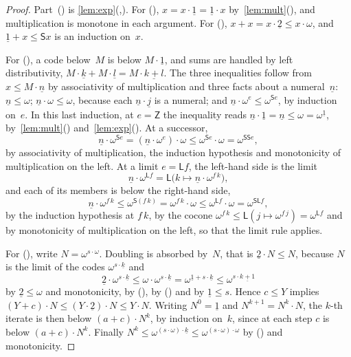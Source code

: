 \documentclass[11pt]{amsart}
\newcommand{\bZ}{\mathsf{Z}}
\newcommand{\bS}{\mathsf{S}}
\newcommand{\bL}{\mathsf{L}}
\newcommand{\bplus}{\mathbin{+}}
\newcommand{\btimes}{\mathbin{\cdot}}
\newcommand{\num}[1]{\underline{#1}}          %
\theoremstyle{plain}
\theoremstyle{definition}
\begin{document}
\begin{proof}
Part~() is
\cref{lem:exp}(,). For
(), $x = x \btimes \num 1 = \num 1 \btimes
x$ by~\cref{lem:mult}(), and multiplication
is monotone in each argument. For
(), $x \bplus x = x \btimes \num 2 \le
x \btimes \omega$, and $\num 1 \bplus x \le \bS x$ is an induction
on~$x$.

For (), a code below~$M$ is below
$M \btimes \num 1$, and sums are handled by left distributivity,
$M \btimes \num k \bplus M \btimes \num l = M \btimes \num{k+l}$. The
three inequalities follow from $x \le M \btimes \num n$ by
associativity of multiplication and three facts about a
numeral~$\num n$: $\num n \le \omega$; $\num n \btimes \omega \le
\omega$, because each $\num n \btimes \num j$ is a numeral; and
$\num n \btimes \omega^{e} \le \omega^{\bS e}$, by induction on~$e$.
In this last induction, at $e = \bZ$ the inequality reads
$\num n \btimes \num 1 = \num n \le \omega = \omega^{\num 1}$,
by~\cref{lem:mult}()
and~\cref{lem:exp}(). At a successor,
\[
  \num n \btimes \omega^{\bS e}
  = (\num n \btimes \omega^{e}) \btimes \omega
  \le \omega^{\bS e} \btimes \omega = \omega^{\bS\bS e} ,
\]
by associativity of multiplication, the induction hypothesis and
monotonicity of multiplication on the left. At a limit
$e = \bL f$, the left-hand side is the limit
\[
  \num n \btimes \omega^{\bL f}
  = \bL\big(k \mapsto \num n \btimes \omega^{f\,k}\big) ,
\]
and each of its members is below the right-hand side,
\[
  \num n \btimes \omega^{f\,k} \le \omega^{\bS(f\,k)}
  = \omega^{f\,k} \btimes \omega
  \le \omega^{\bL f} \btimes \omega = \omega^{\bS\bL f} ,
\]
by the induction hypothesis at $f\,k$, by the cocone
$\omega^{f\,k} \le \bL(j \mapsto \omega^{f\,j}) = \omega^{\bL f}$ and
by monotonicity of multiplication on the left, so that the limit rule
applies.

For (), write $N = \omega^{s \btimes \omega}$.
Doubling is absorbed by~$N$, that is $\num 2 \btimes N \le N$, because
$N$ is the limit of the codes $\omega^{s \btimes \num k}$ and
\[
  \num 2 \btimes \omega^{s \btimes \num k}
  \le \omega \btimes \omega^{s \btimes \num k}
  = \omega^{\num 1 \bplus s \btimes \num k}
  \le \omega^{s \btimes \num{k+1}}
\]
by $\num 2 \le \omega$ and monotonicity, by (),
by () and by $\num 1 \le s$. Hence $c \le Y$
implies
$(Y \bplus c) \btimes N \le (Y \btimes \num 2) \btimes N \le
Y \btimes N$. Writing $N^{0} = \num 1$ and
$N^{k+1} = N^{k} \btimes N$, the $k$-th iterate is then below
$(a \bplus c) \btimes N^{k}$, by induction on~$k$, since at each step
$c$ is below $(a \bplus c) \btimes N^{k}$. Finally
$N^{k} \le \omega^{(s \btimes \omega) \btimes \num k} \le
\omega^{(s \btimes \omega) \btimes \omega}$ by
() and monotonicity.
\end{proof}
\end{document}
